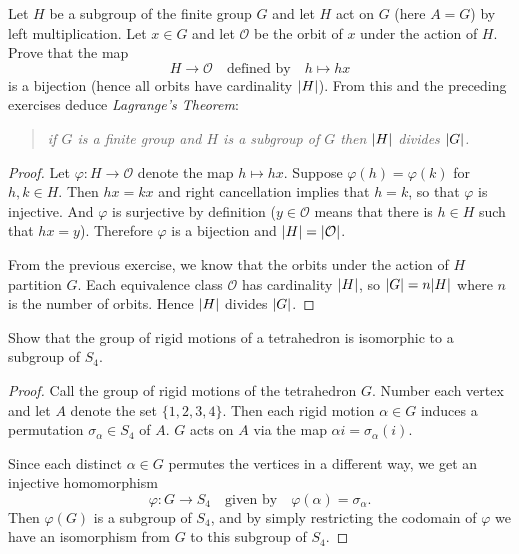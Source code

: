  Let $H$ be a subgroup of the finite group $G$ and let
$H$ act on $G$ (here $A = G$) by left multiplication. Let $x\in G$ and
let $\mathcal{O}$ be the orbit of $x$ under the action of $H$. Prove
that the map
\begin{equation*}
  H\to\mathcal{O}
  \quad\text{defined by}\quad
  h\mapsto hx
\end{equation*}
is a bijection (hence all orbits have cardinality $\lvert{H}\rvert$). From
this and the preceding exercises deduce {\em Lagrange's Theorem}:
\begin{quote}
  \em if $G$ is a finite group and $H$ is a subgroup of $G$ then
  $\lvert{H}\rvert$ divides $\lvert{G}\rvert$.
\end{quote}
\begin{proof}
  Let $\varphi\colon H\to\mathcal{O}$ denote the map $h\mapsto
  hx$. Suppose $\varphi(h) = \varphi(k)$ for $h,k\in H$. Then
  $hx = kx$ and right cancellation implies that $h = k$, so that
  $\varphi$ is injective. And $\varphi$ is surjective by definition
  ($y\in\mathcal{O}$ means that there is $h\in H$ such that $hx =
  y$). Therefore $\varphi$ is a bijection and
  $\lvert{H}\rvert = \lvert{\mathcal{O}}\rvert$.

  From the previous exercise, we know that the orbits under the action
  of $H$ partition $G$. Each equivalence class $\mathcal{O}$ has
  cardinality $\lvert{H}\rvert$, so $\lvert{G}\rvert = n\lvert{H}\rvert$ where $n$ is the
  number of orbits. Hence $\lvert{H}\rvert$ divides $\lvert{G}\rvert$.
\end{proof}

 Show that the group of rigid motions of a tetrahedron is
isomorphic to a subgroup of $S_4$.
\begin{proof}
  Call the group of rigid motions of the tetrahedron $G$. Number each
  vertex and let $A$ denote the set $\{1,2,3,4\}$. Then each rigid
  motion $\alpha\in G$ induces a permutation $\sigma_\alpha\in S_4$ of
  $A$. $G$ acts on $A$ via the map $\alpha i = \sigma_\alpha(i)$.

  Since each distinct $\alpha\in G$ permutes the vertices in a
  different way, we get an injective homomorphism
  \begin{equation*}
    \varphi\colon G\to S_4
    \quad\text{given by}\quad
    \varphi(\alpha) = \sigma_\alpha.
  \end{equation*}
  Then $\varphi(G)$ is a subgroup of $S_4$, and by simply restricting
  the codomain of $\varphi$ we have an isomorphism from $G$ to this
  subgroup of $S_4$.
\end{proof}

